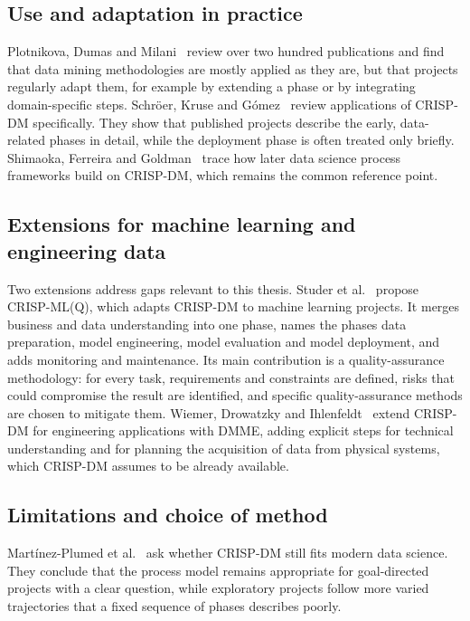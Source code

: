 \documentclass[11pt,a4paper]{article}
\begin{document}
\subsection{Use and adaptation in practice}

Plotnikova, Dumas and Milani~\cite{plotnikova2020} review over two hundred
publications and find that data mining methodologies are mostly applied as they
are, but that projects regularly adapt them, for example by extending a phase or
by integrating domain-specific steps. Schr\"oer, Kruse and
G\'omez~\cite{schroer2021} review applications of CRISP-DM specifically. They
show that published projects describe the early, data-related phases in detail,
while the deployment phase is often treated only briefly. Shimaoka, Ferreira and
Goldman~\cite{shimaoka2024} trace how later data science process frameworks
build on CRISP-DM, which remains the common reference point.

\subsection{Extensions for machine learning and engineering data}

Two extensions address gaps relevant to this thesis. Studer et
al.~\cite{studer2021} propose CRISP-ML(Q), which adapts CRISP-DM to machine
learning projects. It merges business and data understanding into one phase,
names the phases data preparation, model engineering, model evaluation and model
deployment, and adds monitoring and maintenance. Its main contribution is a
quality-assurance methodology: for every task, requirements and constraints are
defined, risks that could compromise the result are identified, and specific
quality-assurance methods are chosen to mitigate them. Wiemer, Drowatzky and
Ihlenfeldt~\cite{wiemer2019} extend CRISP-DM for engineering applications with
DMME, adding explicit steps for technical understanding and for planning the
acquisition of data from physical systems, which CRISP-DM assumes to be already
available.

\subsection{Limitations and choice of method}

Mart\'inez-Plumed et al.~\cite{martinezplumed2021} ask whether CRISP-DM still
fits modern data science. They conclude that the process model remains
appropriate for goal-directed projects with a clear question, while exploratory
projects follow more varied trajectories that a fixed sequence of phases
describes poorly.
\end{document}

